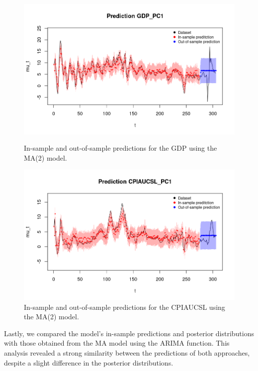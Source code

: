 \begin{figure}[H]
    \centering
    \begin{minipage}{0.49\textwidth}
        \centering
        \includegraphics[width=\textwidth]{images/3-MA/gdp_prediction2.png}
        \caption{In-sample and out-of-sample predictions for the GDP using the MA(2) model.}
        \label{fig:MA2_gdp_prediction}
    \end{minipage}\hfill
    \begin{minipage}{0.49\textwidth}
        \centering
        \includegraphics[width=\textwidth]{images/3-MA/infl_prediction2.png}
        \caption{In-sample and out-of-sample predictions for the CPIAUCSL using the MA(2) model.}
        \label{fig:MA2_infl_prediction}
    \end{minipage}
\end{figure}
Lastly, we compared the model's in-sample predictions and posterior distributions with those obtained from the MA model using the ARIMA function. This analysis revealed a strong similarity between the predictions of both approaches, despite a slight difference in the posterior distributions.
